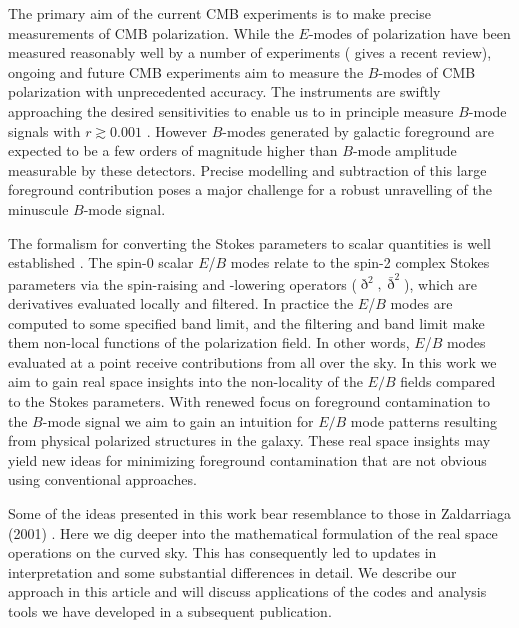 The primary aim of the current CMB experiments is to make precise measurements of CMB polarization. While the $E$-modes of polarization have been measured reasonably well by a number of experiments (\cite{2018RPPh...81d4901S} gives a recent review),  ongoing and future CMB experiments aim to measure the $B$-modes of CMB polarization with unprecedented accuracy. The instruments are swiftly approaching the desired sensitivities to enable us to in principle measure $B$-mode signals with $r\gtrsim 0.001$ \cite{Spider, CLASS,Litebird, BICEP22015, 2016arXiv161002743A, 2017arXiv170602464A,Remazeilles2018}. However $B$-modes generated by galactic foreground are expected to be a few orders of magnitude higher than $B$-mode amplitude measurable by these detectors.  Precise modelling and subtraction of this large foreground contribution poses a major challenge for a robust unravelling of the minuscule $B$-mode signal. 
 
The formalism for converting the Stokes parameters to scalar quantities is well established \citep{1997PhRvD..55.7368K,1997PhRvD..55.1830Z}. The spin-0 scalar $E$/$B$ modes relate to the spin-2 complex Stokes parameters via the spin-raising and -lowering operators ($\eth^2,\bar \eth^2$), which are derivatives evaluated locally and filtered.  In practice the $E$/$B$ modes are computed to some specified band limit, and the filtering and band limit make them non-local functions of the polarization field.  In other words, $E$/$B$ modes evaluated at a point receive contributions from all over the sky. In this work we aim to gain real space insights into the non-locality of the $E/B$ fields compared to the Stokes parameters. With renewed focus on foreground contamination to the $B$-mode signal we aim to gain an intuition for $E/B$ mode patterns resulting from physical polarized structures in the galaxy. These real space insights may yield new ideas for minimizing foreground contamination that are not obvious using conventional approaches. 

{Some of the ideas presented in this work bear resemblance to those in Zaldarriaga (2001) \citep{Zaldarriaga2001a}.  Here we dig deeper into the mathematical formulation of the real space operations on the curved sky.  This has consequently led to updates in interpretation and some substantial differences in detail.  We describe our approach in this article and will discuss applications of the codes and analysis tools we have developed in a subsequent publication.}
 
